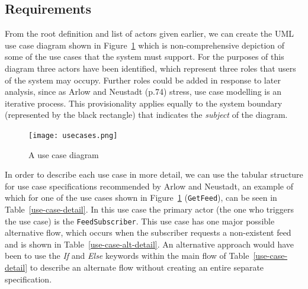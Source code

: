 \documentclass{article}
\begin{document}
\subsection{Requirements}

From the root definition and list of actors given earlier, we can create the UML use case diagram shown in Figure~\ref{use-cases} which is non-comprehensive depiction of some of the use cases that the system must support. For the purposes of this diagram three actors have been identified, which represent three roles that users of the system may occupy. Further roles could be added in response to later analysis, since as Arlow and Neustadt (p.74) stress, use case modelling is an iterative process. This provisionality applies equally to the system boundary (represented by the black rectangle) that indicates the \textit{subject} of the diagram.

\begin{figure}
  \texttt{[image: usecases.png]}
  \caption{A use case diagram}
  \label{use-cases}
\end{figure}

In order to describe each use case in more detail, we can use the tabular structure for use case specifications recommended by Arlow and Neustadt, an example of which for one of the use cases shown in Figure~\ref{use-cases} (\texttt{GetFeed}), can be seen in Table~\ref{use-case-detail}. In this use case the primary actor (the one who triggers the use case) is the \texttt{FeedSubscriber}. This use case has one major possible alternative flow, which occurs when the subscriber requests a non-existent feed and is shown in Table~\ref{use-case-alt-detail}. An alternative approach would have been to use the \textit{If} and \textit{Else} keywords within the main flow of Table~\ref{use-case-detail} to describe an alternate flow without creating an entire separate specification.
\end{document}
